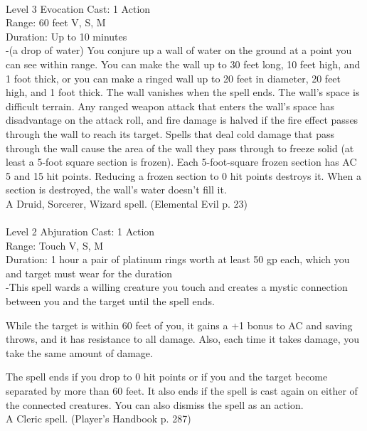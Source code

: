 \documentclass[10pt,twocolumn]{report}
\begin{document}
 \\
Level 3 \quad Evocation \quad Cast: 1 Action\\
Range: 60 feet \quad V, S, M\\
Duration: Up to 10 minutes \quad \\
-(a drop of water)
You conjure up a wall of water on the ground at a point you can see within range. You can make the wall up to 30 feet long, 10 feet high, and 1 foot thick, or you can make a ringed wall up to 20 feet in diameter, 20 feet high, and 1 foot thick. The wall vanishes when the spell ends. The wall’s space is difficult terrain.
Any ranged weapon attack that enters the wall’s space has disadvantage on the attack roll, and fire damage
is halved if the fire effect passes through the wall to reach its target. Spells that deal cold damage that pass through the wall cause the area of the wall they pass through to freeze solid (at least a 5-foot square section is frozen). Each 5-foot-square frozen section has AC 5 and 15 hit points. Reducing a frozen section to 0 hit points destroys it. When a section is destroyed, the wall’s water doesn’t fill it.\\
A Druid, Sorcerer, Wizard spell. (Elemental Evil p. 23) \\


 \\
Level 2 \quad Abjuration \quad Cast: 1 Action\\
Range: Touch \quad V, S, M\\
Duration: 1 hour \quad a pair of platinum rings worth at least 50 gp each, which you and target must wear for the duration\\
-This spell wards a willing creature you touch and creates a mystic connection between you and the target until the spell ends.

While the target is within 60 feet of you, it gains a +1 bonus to AC and saving throws, and it has resistance to all damage. Also, each time it takes damage, you take the same amount of damage.

The spell ends if you drop to 0 hit points or if you and the target become separated by more than 60 feet. It also ends if the spell is cast again on either of the connected creatures. You can also dismiss the spell as an action.\\
A Cleric spell. (Player's Handbook p. 287) \\
\end{document}
